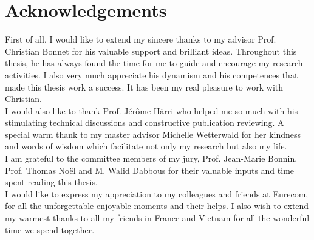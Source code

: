 \documentclass[a4paper,10pt,twoside]{ThesisStyle}
\begin{document}


\cleardoublepage

\vspace{3cm}
\dominitoc
{}
\cleardoublepage




\chapter*{Acknowledgements}

First of all, I would like to extend my sincere thanks to my advisor Prof. Christian Bonnet for his valuable support and brilliant ideas. Throughout this thesis, he has always found the time for me to guide and encourage my research activities. I also very much appreciate his dynamism and his competences that made this thesis work a success. It has been my real pleasure to work with Christian. \\

I would also like to thank Prof. Jérôme Härri who helped me so much with his stimulating technical discussions and constructive publication reviewing. A special warm thank to my master advisor Michelle Wetterwald for her kindness and words of wisdom which facilitate not only my research but also my life.\\

I am grateful to the committee members of my jury, Prof. Jean-Marie Bonnin, Prof. Thomas Noël and M. Walid Dabbous for their valuable inputs and time spent reading this thesis. \\

I would like to express my appreciation to my colleagues and friends at Eurecom, for all the unforgettable enjoyable moments and their helps. I also wish to extend my warmest thanks to all my friends in France and Vietnam for all the wonderful time we spend together.\\
\end{document}
